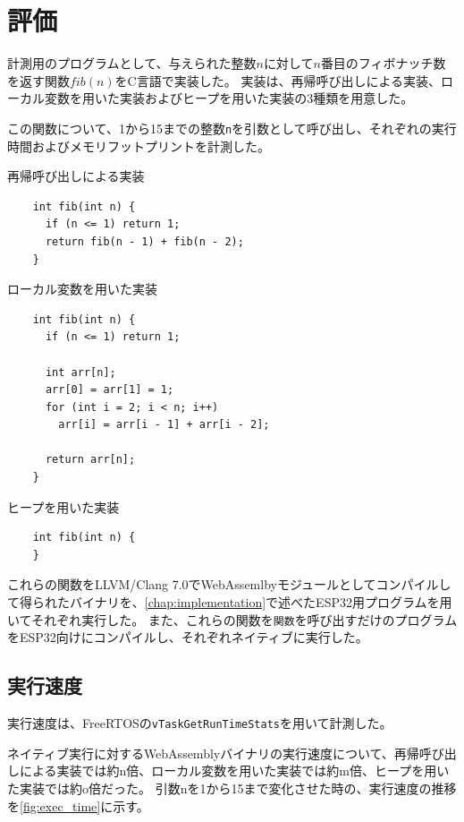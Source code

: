 \chapter{評価}
\label{chap:evaluation}

計測用のプログラムとして、与えられた整数$n$に対して$n$番目のフィボナッチ数を返す関数$fib(n)$をC言語で実装した。
実装は、再帰呼び出しによる実装、ローカル変数を用いた実装およびヒープを用いた実装の3種類を用意した。

この関数について、1から15までの整数\verb|n|を引数として呼び出し、それぞれの実行時間およびメモリフットプリントを計測した。

\begin{itembox}[l]{再帰呼び出しによる実装}
  \begin{verbatim}
    int fib(int n) {
      if (n <= 1) return 1;
      return fib(n - 1) + fib(n - 2);
    }
  \end{verbatim}
\end{itembox}

\begin{itembox}[l]{ローカル変数を用いた実装}
  \begin{verbatim}
    int fib(int n) {
      if (n <= 1) return 1;

      int arr[n];
      arr[0] = arr[1] = 1;
      for (int i = 2; i < n; i++)
        arr[i] = arr[i - 1] + arr[i - 2];

      return arr[n];
    }
  \end{verbatim}
\end{itembox}

\begin{itembox}[l]{ヒープを用いた実装}
  \begin{verbatim}
    int fib(int n) {
    }
  \end{verbatim}
\end{itembox}

これらの関数をLLVM/Clang 7.0でWebAssemlbyモジュールとしてコンパイルして得られたバイナリを、\ref{chap:implementation}で述べたESP32用プログラムを用いてそれぞれ実行した。
また、これらの関数を\verb|関数|を呼び出すだけのプログラムをESP32向けにコンパイルし、それぞれネイティブに実行した。

\section{実行速度}

実行速度は、FreeRTOSの\verb|vTaskGetRunTimeStats|を用いて計測した。

ネイティブ実行に対するWebAssemblyバイナリの実行速度について、再帰呼び出しによる実装では約n倍、ローカル変数を用いた実装では約m倍、ヒープを用いた実装では約o倍だった。
引数nを1から15まで変化させた時の、実行速度の推移を\ref{fig:exec_time}に示す。

